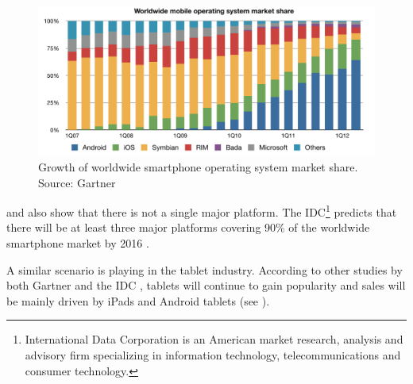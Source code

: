 \begin{figure}[h!]
    \begin{center}
        \includegraphics[width=\textwidth]{figs/smartphone_os.pdf}
        \caption{
            Growth of worldwide smartphone operating system market share.\newline 
            Source: Gartner \citeGartner
        	}
        \label{fig:smartphone-os}
    \end{center}
\end{figure}

 and  also show that there is not a single major platform. The IDC\footnote{International Data Corporation is an American market research, analysis and advisory firm specializing in information technology, telecommunications and consumer technology.} predicts that there will be at least three major platforms covering 90\% of the worldwide smartphone market by 2016 \cite{IDC:phone}.

A similar scenario is playing in the tablet industry. According to other studies by both Gartner \citep{Gartner:11tab,Gartner:12tab} and the IDC \citep{IDC:tablet}, tablets will continue to gain popularity and sales will be mainly driven by iPads and Android tablets (see ).

